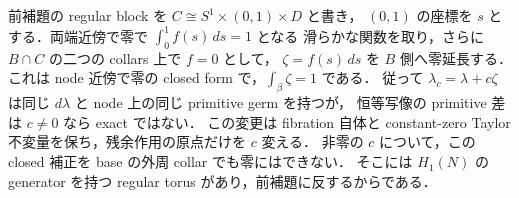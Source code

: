\begin{example}
\label{ke:focus-local-primitive-shift}
前補題の regular block を $C\cong S^1\times(0,1)\times D$ と書き，
$(0,1)$ の座標を $s$ とする．両端近傍で零で $\int_0^1f(s)\,ds=1$ となる
滑らかな関数を取り，さらに $B\cap C$ の二つの collars 上で $f=0$ として，
$\zeta=f(s)\,ds$ を $B$ 側へ零延長する．
これは node 近傍で零の closed form で，$\int_\beta\zeta=1$ である．
従って $\lambda_c=\lambda+c\zeta$ は同じ $d\lambda$ と node 上の同じ primitive germ を持つが，
恒等写像の primitive 差は $c\ne0$ なら exact ではない．
この変更は fibration 自体と constant-zero Taylor 不変量を保ち，残余作用の原点だけを $c$ 変える．
非零の $c$ について，この closed 補正を base の外周 collar でも零にはできない．
そこには $H_1(N)$ の generator を持つ regular torus があり，前補題に反するからである．
\end{example}


